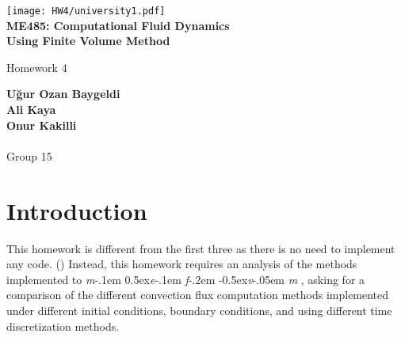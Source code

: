 \documentclass[a4paper, 12pt]{article}
\newcommand\mefvm{%
    \textit{m}\kern-.1em%
    \raise0.5ex\hbox{\textit{e}}\kern-.1em%
    \textit{f}\kern-.2em%
    \raise-0.5ex\hbox{\textit{v}}\kern-.05em%
    \textit{m}
}
\begin{document}
\doublespacing
\begin{titlepage}
    \begin{center}
        \texttt{[image: HW4/university1.pdf]}\\
        
        \textbf{ME485: Computational Fluid Dynamics \\ Using Finite Volume Method}

        \vspace{0.5cm}
        Homework 4
            
        \vspace{1.5cm}

        \textbf{Uğur Ozan Baygeldi}\\
        \textbf{Ali Kaya}\\ 
        \textbf{Onur Kakilli}\\~\\
        Group 15
        
    \end{center}
\end{titlepage}
\section{Introduction}
This homework is different from the first three as there is no need to implement any code. (\cite{hw3}) Instead, this homework requires an analysis of the methods implemented to \mefvm\hspace{-0.3em}, asking for a comparison of the different convection flux computation methods implemented under different initial conditions, boundary conditions, and using different time discretization methods.
\end{document}
